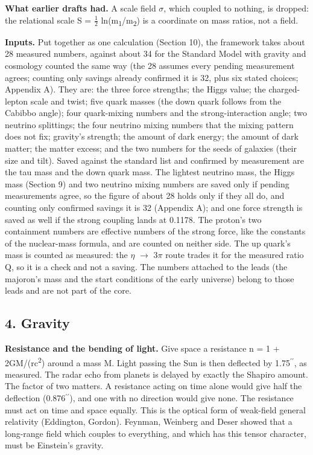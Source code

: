 \documentclass[
  11pt,
]{article}
\newcounter{none} %
\begin{document}
\textbf{What earlier drafts had.} A scale field \ensuremath{\sigma}, which coupled to nothing, is dropped: the relational scale S = \ensuremath{\frac{1}{2}} ln(m\textsubscript{1}/m\textsubscript{2}) is a coordinate on mass ratios, not a field.

\textbf{Inputs.} Put together as one calculation (Section 10), the framework takes about 28 measured numbers, against about 34 for the Standard Model with gravity and cosmology counted the same way (the 28 assumes every pending measurement agrees; counting only savings already confirmed it is 32, plus six stated choices; Appendix A). They are: the three force strengths; the Higgs value; the charged-lepton scale and twist; five quark masses (the down quark follows from the Cabibbo angle); four quark-mixing numbers and the strong-interaction angle; two neutrino splittings; the four neutrino mixing numbers that the mixing pattern does not fix; gravity's strength; the amount of dark energy; the amount of dark matter; the matter excess; and the two numbers for the seeds of galaxies (their size and tilt). Saved against the standard list and confirmed by measurement are the tau mass and the down quark mass. The lightest neutrino mass, the Higgs mass (Section 9) and two neutrino mixing numbers are saved only if pending measurements agree, so the figure of about 28 holds only if they all do, and counting only confirmed savings it is 32 (Appendix A); and one force strength is saved as well if the strong coupling lands at 0.1178. The proton's two containment numbers are effective numbers of the strong force, like the constants of the nuclear-mass formula, and are counted on neither side. The up quark's mass is counted as measured: the \ensuremath{\eta} \ensuremath{\to} 3\ensuremath{\pi} route trades it for the measured ratio Q, so it is a check and not a saving. The numbers attached to the leads (the majoron's mass and the start conditions of the early universe) belong to those leads and are not part of the core.

\hypertarget{gravity}{%
\subsection{4. Gravity}\label{gravity}}

\textbf{Resistance and the bending of light.} Give space a resistance n = 1 + 2GM/(rc\textsuperscript{2}) around a mass M. Light passing the Sun is then deflected by 1.75\ensuremath{^{\prime\prime}}, as measured. The radar echo from planets is delayed by exactly the Shapiro amount. The factor of two matters. A resistance acting on time alone would give half the deflection (0.876\ensuremath{^{\prime\prime}}), and one with no direction would give none. The resistance must act on time and space equally. This is the optical form of weak-field general relativity (Eddington, Gordon). Feynman, Weinberg and Deser showed that a long-range field which couples to everything, and which has this tensor character, must be Einstein's gravity.
\end{document}

